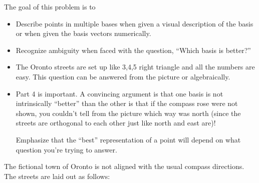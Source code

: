 \documentclass{problemset}
\begin{document}
	\question
	\begin{annotation}
		\begin{goals}

			The goal of this problem is to
			\begin{itemize}
				\item Describe points in multiple bases when given a visual description of the basis
					or when given the basis vectors numerically.
				\item Recognize ambiguity when faced with the question, ``Which basis is better?''
			\end{itemize}
		\end{goals}

		\begin{notes}
			\begin{itemize}
				\item The Oronto streets are set up like 3,4,5 right triangle and all the numbers are easy.
					This question can be answered from the picture or algebraically.
				\item Part 4 is important. A convincing argument is that one basis is not intrinsically
					``better'' than the other is that if the compass rose were
					not shown, you couldn't tell from the picture which way was north (since the streets are orthogonal
					to each other just like north and east are)!

					Emphasize that the ``best'' representation of a point will depend on what
					question you're trying to answer.
			\end{itemize}
		\end{notes}
	\end{annotation}
	The fictional town of Oronto is not aligned with the usual
	compass directions. The streets are laid out as follows:
\end{document}
